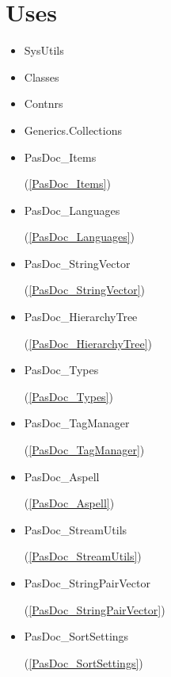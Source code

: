 \documentclass{report}
\begin{document}
\section{Uses}
\begin{itemize}
\item \begin{ttfamily}SysUtils\end{ttfamily}\item \begin{ttfamily}Classes\end{ttfamily}\item \begin{ttfamily}Contnrs\end{ttfamily}\item \begin{ttfamily}Generics.Collections\end{ttfamily}\item \begin{ttfamily}PasDoc{\_}Items\end{ttfamily}(\ref{PasDoc_Items})\item \begin{ttfamily}PasDoc{\_}Languages\end{ttfamily}(\ref{PasDoc_Languages})\item \begin{ttfamily}PasDoc{\_}StringVector\end{ttfamily}(\ref{PasDoc_StringVector})\item \begin{ttfamily}PasDoc{\_}HierarchyTree\end{ttfamily}(\ref{PasDoc_HierarchyTree})\item \begin{ttfamily}PasDoc{\_}Types\end{ttfamily}(\ref{PasDoc_Types})\item \begin{ttfamily}PasDoc{\_}TagManager\end{ttfamily}(\ref{PasDoc_TagManager})\item \begin{ttfamily}PasDoc{\_}Aspell\end{ttfamily}(\ref{PasDoc_Aspell})\item \begin{ttfamily}PasDoc{\_}StreamUtils\end{ttfamily}(\ref{PasDoc_StreamUtils})\item \begin{ttfamily}PasDoc{\_}StringPairVector\end{ttfamily}(\ref{PasDoc_StringPairVector})\item \begin{ttfamily}PasDoc{\_}SortSettings\end{ttfamily}(\ref{PasDoc_SortSettings})\end{itemize}
\end{document}
